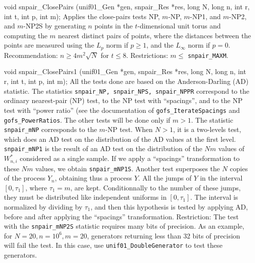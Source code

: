 void snpair_ClosePairs (unif01_Gen *gen, snpair_Res *res,
                        long N, long n, int r, int t, int p, int m);
\endcode
 \tab Applies the close-pairs tests NP, $m$-NP, $m$-NP1, and $m$-NP2,
   and $m$-NP2S
   by generating $n$ points in the $t$-dimensional unit torus
   and computing the $m$ nearest distinct pairs of points, where
   the distances between the points are measured using the 
   $L_p$ norm if $p \ge 1$, and the $L_\infty$ norm if $p=0$.
   Recommendation:  $n \ge 4m^2 \sqrt{N}$ for $t\le 8$.
   Restrictions:  $m\le$ {\tt snpair\_MAXM}.
 \endtab
\hide  %
\code


void snpair_ClosePairs1 (unif01_Gen *gen, snpair_Res *res,
                         long N, long n, int r, int t, int p, int m);
\endcode
 \tab
   All the tests done are  based on the Anderson-Darling (AD) statistic.
   The statistics {\tt snpair\_NP, snpair\_NPS, snpair\_NPPR}
   correspond to the ordinary nearest-pair
   (NP) test, to the NP test with  ``spacings'', and to the NP test with
    ``power ratio'' (see the documentation of
   {\tt gofs\_IterateSpacings} and  {\tt gofs\_PowerRatios}.
   The other tests will be done only if $m > 1$.
   The statistic {\tt snpair\_mNP} corresponds to the $m$-NP test.
   When $N > 1$, it is a two-levels test, which does an AD test 
   on the distribution of the AD values at the first level.
   {\tt snpair\_mNP1} is the result of an AD test on the distribution
   of the $Nm$ values of $W^*_{n,i}$ considered as a single sample.
   If we apply a ``spacings'' transformation  to these
   $Nm$ values, we obtain {\tt snpair\_mNP1S}.
   Another test superposes the $N$ copies of the process $Y_n$,
   obtaining thus a process $Y$.  All the jumps of $Y$
   in the interval $[0, \tau_1]$, where $\tau_1 = m$, are kept.
   Conditionnally  to the number of these jumps, they must be distributed
   like independent uniforms  in $[0,\tau_1]$.
   The interval is normalized by dividing by $\tau_1$, and then
   this hypothesis is tested by applying AD, before and after applying the
   ``spacings'' transformation.
   Restriction: The test with the {\tt snpair\_mNP2S} statistic requires
   many bits of precision.  As an example, for $N=20, n=10^6, m=20$, 
   generators returning less than 32 bits of precision will fail the
   test. In this case, use {\tt unif01\_DoubleGenerator} to test these
   generators.
 \endtab
\code

